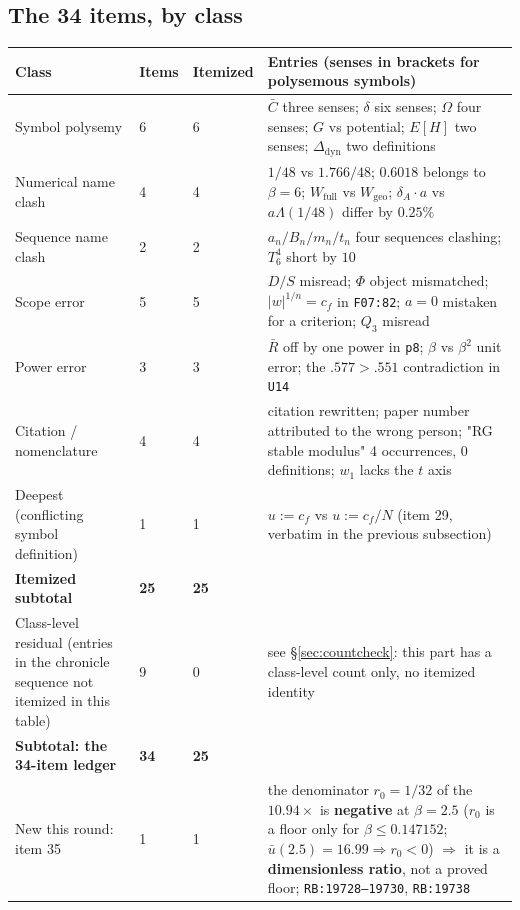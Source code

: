 \documentclass[11pt,a4paper]{article}
\newcommand{\bet}{\beta}
\newcommand{\rO}{r_0}
\newcommand{\Cbar}{\bar{C}}
\newcommand{\ubar}{\bar{u}}
\newcommand{\Rbar}{\bar{R}}
\newcommand{\Wfull}{W_{\mathrm{full}}}
\newcommand{\Wgeo}{W_{\mathrm{geo}}}
\newcommand{\Ddyn}{\Delta_{\mathrm{dyn}}}
\begin{document}
\subsection{The 34 items, by class}

\begin{center}
\small
\begin{tabularx}{\textwidth}{@{}L{2.1cm} L{1.2cm} L{1.45cm} Y@{}}
\toprule
\textbf{Class} & \textbf{Items} & \textbf{Itemized} & \textbf{Entries (senses in brackets for polysemous symbols)} \\
\midrule
Symbol polysemy & 6 & 6 & $\Cbar$ three senses; $\delta$ six senses; $\Omega$ four senses; $G$ vs potential; $E[H]$ two senses; $\Ddyn$ two definitions \\
Numerical name clash & 4 & 4 & $1/48$ vs $1.766/48$; $0.6018$ belongs to $\bet=6$; $\Wfull$ vs $\Wgeo$; $\delta_A\cdot a$ vs $a\Lambda(1/48)$ differ by $0.25\%$ \\
Sequence name clash & 2 & 2 & $a_n/B_n/m_n/t_n$ four sequences clashing; $T^4_6$ short by $10$ \\
Scope error & 5 & 5 & $D/S$ misread; $\Phi$ object mismatched; $|w|^{1/n}=c_f$ in \texttt{F07:82}; $a=0$ mistaken for a criterion; $Q_3$ misread \\
Power error & 3 & 3 & $\Rbar$ off by one power in \texttt{p8}; $\bet$ vs $\bet^2$ unit error; the $.577>.551$ contradiction in \texttt{U14} \\
Citation / nomenclature & 4 & 4 & citation rewritten; paper number attributed to the wrong person; "RG stable modulus" 4 occurrences, 0 definitions; $w_1$ lacks the $t$ axis \\
\midrule
Deepest (conflicting symbol definition) & 1 & 1 & $u:=c_f$ vs $u:=c_f/N$ (item 29, verbatim in the previous subsection) \\
\midrule
\textbf{Itemized subtotal} & \textbf{25} & \textbf{25} & \\
\midrule
Class-level residual (entries in the chronicle sequence not itemized in this table) & 9 & 0 & see \S\ref{sec:countcheck}: this part has a class-level count only, no itemized identity \\
\midrule
\textbf{Subtotal: the 34-item ledger} & \textbf{34} & \textbf{25} & \\
\midrule
New this round: item 35 & 1 & 1 & the denominator $\rO=1/32$ of the $10.94\times$ is \textbf{negative} at $\bet=2.5$ ($\rO$ is a floor only for $\bet\le 0.147152$; $\ubar(2.5)=16.99\Rightarrow\rO<0$) $\Rightarrow$ it is a \textbf{dimensionless ratio}, not a proved floor; \texttt{RB:19728--19730}, \texttt{RB:19738} \\

\end{tabularx}
\end{center}
\end{document}
